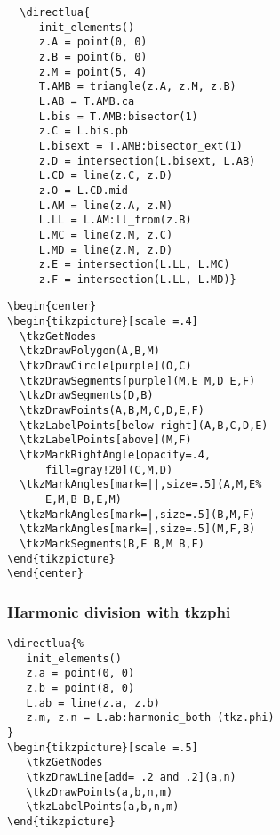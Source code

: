 \begin{minipage}{.5\textwidth}
  \begin{verbatim}
  \directlua{
     init_elements()
     z.A = point(0, 0)
     z.B = point(6, 0)
     z.M = point(5, 4)
     T.AMB = triangle(z.A, z.M, z.B)
     L.AB = T.AMB.ca
     L.bis = T.AMB:bisector(1)
     z.C = L.bis.pb
     L.bisext = T.AMB:bisector_ext(1)
     z.D = intersection(L.bisext, L.AB)
     L.CD = line(z.C, z.D)
     z.O = L.CD.mid
     L.AM = line(z.A, z.M)
     L.LL = L.AM:ll_from(z.B)
     L.MC = line(z.M, z.C)
     L.MD = line(z.M, z.D)
     z.E = intersection(L.LL, L.MC)
     z.F = intersection(L.LL, L.MD)}
  \end{verbatim}
\end{minipage}
\begin{minipage}{.5\textwidth}
\begin{verbatim}
\begin{center}
\begin{tikzpicture}[scale =.4]
  \tkzGetNodes
  \tkzDrawPolygon(A,B,M)
  \tkzDrawCircle[purple](O,C)
  \tkzDrawSegments[purple](M,E M,D E,F)
  \tkzDrawSegments(D,B)
  \tkzDrawPoints(A,B,M,C,D,E,F)
  \tkzLabelPoints[below right](A,B,C,D,E)
  \tkzLabelPoints[above](M,F)
  \tkzMarkRightAngle[opacity=.4,
      fill=gray!20](C,M,D)
  \tkzMarkAngles[mark=||,size=.5](A,M,E%
      E,M,B B,E,M)
  \tkzMarkAngles[mark=|,size=.5](B,M,F)
  \tkzMarkAngles[mark=|,size=.5](M,F,B)
  \tkzMarkSegments(B,E B,M B,F)
\end{tikzpicture}
\end{center}
\end{verbatim}
\end{minipage}



\subsubsection{Harmonic division with tkzphi } %
\label{ssub:harmonic_division_with_tkzphi}

\begin{Verbatim}
\directlua{%
   init_elements()
   z.a = point(0, 0)
   z.b = point(8, 0)
   L.ab = line(z.a, z.b)
   z.m, z.n = L.ab:harmonic_both (tkz.phi)
}
\begin{tikzpicture}[scale =.5]
   \tkzGetNodes
   \tkzDrawLine[add= .2 and .2](a,n)
   \tkzDrawPoints(a,b,n,m)
   \tkzLabelPoints(a,b,n,m)
\end{tikzpicture}
\end{Verbatim}


